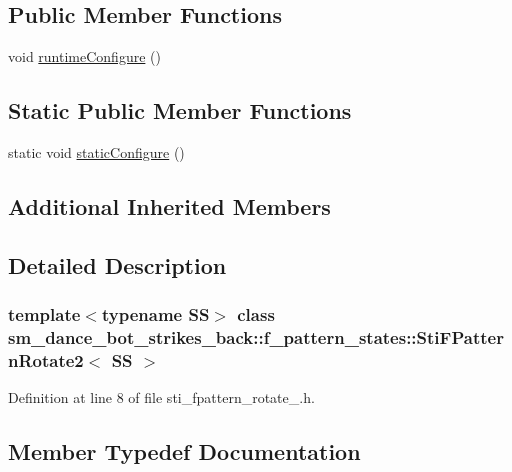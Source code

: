 \subsection*{Public Member Functions}
\begin{DoxyCompactItemize}
\item 
void \hyperlink{structsm__dance__bot__strikes__back_1_1f__pattern__states_1_1StiFPatternRotate2_a54623ed8b5626934d8f4a8dc8c2cf0b9}{runtime\+Configure} ()
\end{DoxyCompactItemize}
\subsection*{Static Public Member Functions}
\begin{DoxyCompactItemize}
\item 
static void \hyperlink{structsm__dance__bot__strikes__back_1_1f__pattern__states_1_1StiFPatternRotate2_ad184e0900067be776d9ddc9f76b470f5}{static\+Configure} ()
\end{DoxyCompactItemize}
\subsection*{Additional Inherited Members}


\subsection{Detailed Description}
\subsubsection*{template$<$typename SS$>$\newline
class sm\+\_\+dance\+\_\+bot\+\_\+strikes\+\_\+back\+::f\+\_\+pattern\+\_\+states\+::\+Sti\+F\+Pattern\+Rotate2$<$ S\+S $>$}



Definition at line 8 of file sti\+\_\+fpattern\+\_\+rotate\+\_.\+h.



\subsection{Member Typedef Documentation}
\mbox{\label{structsm__dance__bot__strikes__back_1_1f__pattern__states_1_1StiFPatternRotate2_acbf56310baa77fbcd80a7648ace4879e}} 
